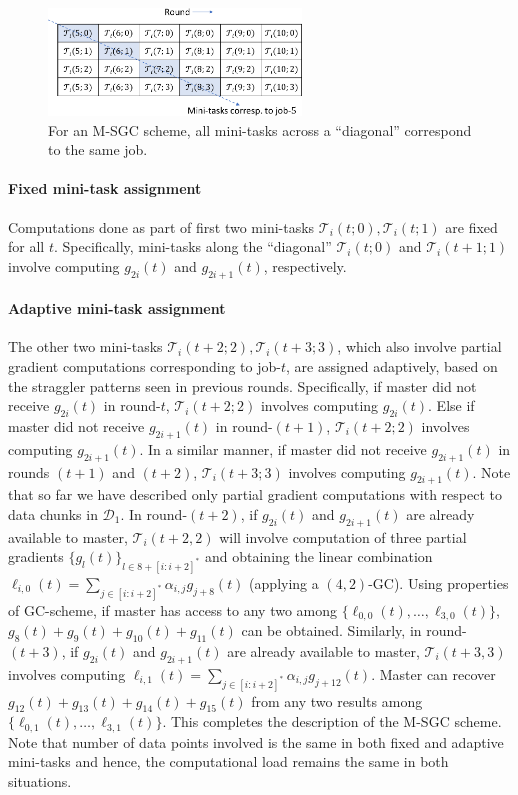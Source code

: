 \begin{figure}[h]
    \centering
    \includegraphics[width=0.6\textwidth]{figs/ch2/fig_B_SGC_example_diag_minitasks_v2}
    \vspace{5pt}
    \caption{
    For an M-SGC scheme, all mini-tasks across a ``diagonal'' correspond to the same job.
    }
    \label{ch2:fig:b_sgc_mini_task_diagonal}
\end{figure}

\paragraph{Fixed mini-task assignment} Computations done as part of first two mini-tasks $\mathcal{T}_i(t;0),\mathcal{T}_i(t;1)$ are fixed for all $t$. Specifically, mini-tasks along the ``diagonal'' $\mathcal{T}_i(t;0)$ and $\mathcal{T}_i(t+1;1)$ involve computing $g_{2i}(t)$ and $g_{2i+1}(t)$, respectively. 

\paragraph{Adaptive mini-task assignment} The other two mini-tasks $\mathcal{T}_i(t+2;2),\mathcal{T}_i(t+3;3)$, which also involve partial gradient computations corresponding to job-$t$, are assigned adaptively, based on the straggler patterns seen in previous rounds. Specifically, if master did not receive $g_{2i}(t)$ in round-$t$, $\mathcal{T}_i(t+2;2)$ involves computing $g_{2i}(t)$. Else if master did not receive $g_{2i+1}(t)$ in round-$(t+1)$, $\mathcal{T}_i(t+2;2)$ involves computing $g_{2i+1}(t)$. {In a similar manner, if master did not receive $g_{2i+1}(t)$ in rounds $(t+1)$ and $(t+2)$, $\mathcal{T}_i(t+3;3)$ involves computing $g_{2i+1}(t)$.} Note that so far we have  described only partial gradient computations with respect to data chunks in $\mathcal{D}_1$. In round-$(t+2)$, if $g_{2i}(t)$ and $g_{2i+1}(t)$ are already available to master, $\mathcal{T}_i(t+2,2)$ will involve computation of three partial gradients $\{g_l(t)\}_{l\in 8+[i:i+2]^*}$ and obtaining the linear combination $\ell_{i,0}(t)=\sum_{j\in[i:i+2]^*}\alpha_{i,j}g_{j+8}(t)$ (applying a $(4,2)$-GC). Using properties of GC-scheme, if master has access to any two among $\{\ell_{0,0}(t),\ldots,\ell_{3,0}(t)\}$, $g_8(t)+g_9(t)+g_{10}(t)+g_{11}(t)$ can be obtained. Similarly, in round-$(t+3)$, if $g_{2i}(t)$ and $g_{2i+1}(t)$ are already available to master, $\mathcal{T}_i(t+3,3)$ involves computing  $\ell_{i,1}(t)=\sum_{j\in[i:i+2]^*}\alpha_{i,j}g_{j+12}(t)$. Master can recover $g_{12}(t)+g_{13}(t)+g_{14}(t)+g_{15}(t)$ from any two results among $\{\ell_{0,1}(t),\ldots,\ell_{3,1}(t)\}$. This completes the description of the M-SGC scheme. Note that number of data points involved is the same in both fixed and adaptive mini-tasks and hence, the computational load remains the same in both situations. 

